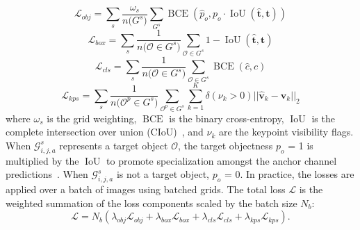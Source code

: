 \documentclass[runningheads]{llncs}
\DeclareMathOperator*{\bce}{BCE}
\DeclareMathOperator*{\iou}{IoU}
\begin{document}
\begin{equation}
    \mathcal{L}_{obj} = \sum_s \frac{\omega_s}{n{(G^s})}\sum_{G^s}\bce(\hat{p}_o, p_o\cdot \iou(\hat{\mathbf{t}}, \mathbf{t}))
\end{equation}
\begin{equation}
    \mathcal{L}_{box} = \sum_s \frac{1}{n{(\mathcal{O}\in G^s})}\sum_{\mathcal{O}\in G^s}1 - \iou(\hat{\mathbf{t}}, \mathbf{t})
\end{equation}
\begin{equation}
    \mathcal{L}_{cls} = \sum_s \frac{1}{n{(\mathcal{O}\in G^s})}\sum_{\mathcal{O}\in G^s}\bce(\hat{c}, c)
\end{equation}
\begin{equation}
    \mathcal{L}_{kps} = \sum_s \frac{1}{n{(\mathcal{O}^p\in G^s})}\sum_{\mathcal{O}^p\in G^s} \sum_{k=1}^K \delta(\nu_k > 0)||\hat{\mathbf{v}}_k - {\mathbf{v}}_k||_2
\end{equation}
where $\omega_s$ is the grid weighting, $\bce$ is the binary cross-entropy, $\iou$ is the complete intersection over union (CIoU)~\cite{zheng2020distance}, and $\nu_k$ are the keypoint visibility flags. When $\mathcal{G}^s_{i,j,a}$ represents a target object $\mathcal{O}$, the target objectness $p_o$ = 1 is multiplied by the $\iou$ to promote specialization amongst the anchor channel predictions~\cite{redmon2016you}. When $\mathcal{G}^s_{i,j,a}$ is not a target object, $p_o$ = 0. In practice, the losses are applied over a batch of images using batched grids. The total loss $\mathcal{L}$ is the weighted summation of the loss components scaled by the batch size $N_b$:
\begin{equation}
\mathcal{L} = N_b(\lambda_{obj}\mathcal{L}_{obj} + \lambda_{box}\mathcal{L}_{box} + \lambda_{cls}\mathcal{L}_{cls} + \lambda_{kps}\mathcal{L}_{kps}).
\end{equation}
\end{document}
